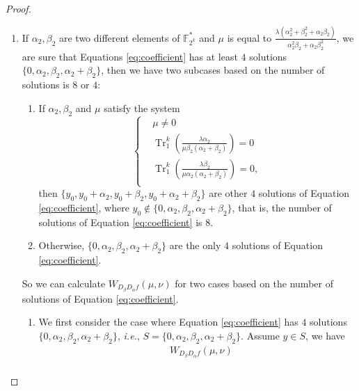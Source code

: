 \documentclass{article}
\newcommand{\F}{\mathbb{F}}
\newcommand{\0}{\textbf{0}}
\newcommand{\1}{\textbf{1}}
\newcommand{\TRACE}{\operatorname{Tr}_1^k}
\theoremstyle{plain}
\begin{document}
\begin{proof}
\begin{enumerate}[label=\textbf{Case \arabic*},wide = 0pt]
            \item If $\alpha_2,\beta_2$ are two different elements of $\F_{2^k}^*$ and $\mu$ is equal to $\frac{\lambda(\alpha_2^2+\beta_2^2+\alpha_2\beta_2)}{\alpha_2^2\beta_2+\alpha_2\beta_2^2}$, 
            we are sure that Equations \eqref{eq:coefficient} has at least $4$ solutions $\{0,\alpha_2,\beta_2,\alpha_2+\beta_2\}$, then we have two subcases based on the number of solutions is $8$ or $4$: 
            \begin{enumerate}[label=(\arabic{*})]
                \item If $\alpha_2,\beta_2$ and $\mu$ satisfy the system 
                \begin{equation}\label{eq:last_four_solution_condition}\left\{
                    \begin{alignedat}{3}
                        &\mu\ne 0\\
                        &\TRACE\left(\frac{\lambda\alpha_2}{\mu\beta_2(\alpha_2+\beta_2)}\right)=0\\
                        &\TRACE\left(\frac{\lambda\beta_2}{\mu\alpha_2(\alpha_2+\beta_2)}\right)=0,\\
                    \end{alignedat}\right.
                \end{equation}
                then $\{y_0,y_0+\alpha_2,y_0+\beta_2,y_0+\alpha_2+\beta_2\}$ are other $4$ solutions of Equation \eqref{eq:coefficient}, where $y_0\notin\{0,\alpha_2,\beta_2,\alpha_2+\beta_2\}$, that is, the number of solutions of Equation \eqref{eq:coefficient} is $8$.
                \item Otherwise, $\{0,\alpha_2,\beta_2,\alpha_2+\beta_2\}$ are the only $4$ solutions of Equation \eqref{eq:coefficient}. 
            \end{enumerate}
            So we can calculate $W_{D_{\beta}D_{\alpha}f}(\mu,\nu)$ for two cases based on the number of solutions of Equation \eqref{eq:coefficient}.
            \begin{enumerate}[label=\textbf{Subcase \Alph{*}},itemindent=*,wide=\parindent]
                \item We first consider the case where Equation \eqref{eq:coefficient} has $4$ solutions 
                $\{0,\alpha_2,\beta_2,\alpha_2+\beta_2\}$, \emph{i.e.}, $S=\{0,\alpha_2,\beta_2,\alpha_2+\beta_2\}$. 
                Assume $y\in S$, we have 
                \begin{align}\label{eq:simpleforms_4}
                    &W_{D_{\beta}D_{\alpha}f}(\mu,\nu)\nonumber\\

\end{align}
\end{enumerate}
\end{enumerate}
\end{proof}
\end{document}
